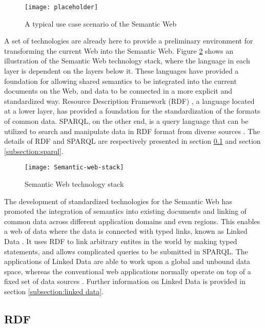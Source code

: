 \begin{figure}[h]
\centering
\texttt{[image: placeholder]}
\caption{A typical use case scenario of the Semantic Web}
\label{figure:usecase1}
\end{figure}

A set of technologies are already here to provide a preliminary environment for transforming the current Web into the Semantic Web. Figure \ref{figure:semantic web stack} shows an illustration of the Semantic Web technology stack, where the language in each layer is dependent on the layers below it. These languages have provided a foundation for allowing shared semantics to be integrated into the current documents on the Web, and data to be connected in a more explicit and standardized way. Resource Description Framework (RDF) \cite{Cyganiak2014}, a language located at a lower layer, has provided a foundation for the standardization of the formats of common data. SPARQL, on the other end, is a query language that can be utilized to search and manipulate data in RDF format from diverse sources \cite{Harris2013}. The details of RDF and SPARQL are respectively presented in section \ref{subsection:rdf} and section \ref{subsection:sparql}.

\begin{figure}[h]
\texttt{[image: Semantic-web-stack]}
\centering
\caption{Semantic Web technology stack}
\label{figure:semantic web stack}
\end{figure}

The development of standardized technologies for the Semantic Web has promoted the integration of semantics into existing documents and linking of common data across different application domains and even regions. This enables a web of data where the data is connected with typed links, known as Linked Data \cite{Bizer2009}. It uses RDF to link arbitrary entites in the world by making typed statements, and allows complicated queries to be submitted in SPARQL. The applications of Linked Data are able to work upon a global and unbound data space, whereas the conventional web applications normally operate on top of a fixed set of data sources \cite{Bizer2009}. Further information on Linked Data is provided in section \ref{subsection:linked data}.

\subsection{RDF} \label{subsection:rdf}

